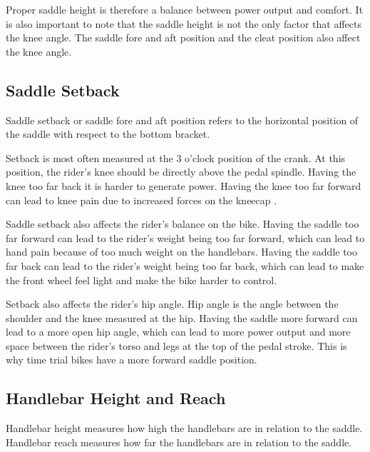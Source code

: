 Proper saddle height is therefore a balance between power output and comfort. It is also important to note that the saddle height is not the only factor that affects the knee angle. The saddle fore and aft position and the cleat position also affect the knee angle.

\subsection{Saddle Setback}
Saddle setback or saddle fore and aft position refers to the horizontal position of the saddle with respect to the bottom bracket.


Setback is most often measured at the 3 o'clock position of the crank. At this position, the rider's knee should be directly above the pedal spindle. Having the knee too far back it is harder to generate power. Having the knee too far forward can lead to knee pain due to increased forces on the kneecap \cite{burtbikefit}.

Saddle setback also affects the rider's balance on the bike. Having the saddle too far forward can lead to the rider's weight being too far forward, which can lead to hand pain because of too much weight on the handlebars. Having the saddle too far back can lead to the rider's weight being too far back, which can lead to make the front wheel feel light and make the bike harder to control.

Setback also affects the rider's hip angle. Hip angle is the angle between the shoulder and the knee measured at the hip. Having the saddle more forward can lead to a more open hip angle, which can lead to more power output and more space between the rider's torso and legs at the top of the pedal stroke. This is why time trial bikes have a more forward saddle position.



\subsection{Handlebar Height and Reach}
Handlebar height measures how high the handlebars are in relation to the saddle. Handlebar reach measures how far the handlebars are in relation to the saddle.

